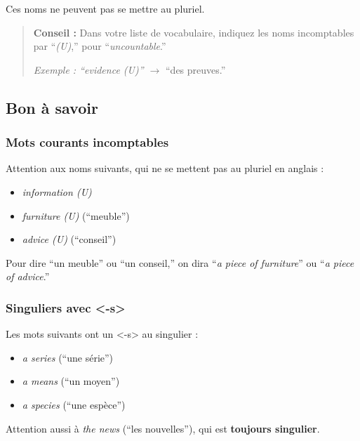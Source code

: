 \documentclass[
  10pt,
]{article}
\providecommand{\tightlist}{%
  \setlength{\itemsep}{0pt}\setlength{\parskip}{0pt}}
\begin{document}
Ces noms ne peuvent pas se mettre au pluriel.

\begin{quote}
\textbf{Conseil :} Dans votre liste de vocabulaire, indiquez les noms incomptables par ``\emph{(U)},'' pour ``\emph{uncountable}.''

\emph{Exemple : ``evidence (U)'' \(\rightarrow\)} ``des preuves.''
\end{quote}

\hypertarget{bon-uxe0-savoir}{%
\subsection{Bon à savoir}\label{bon-uxe0-savoir}}

\hypertarget{mots-courants-incomptables}{%
\subsubsection{Mots courants incomptables}\label{mots-courants-incomptables}}

Attention aux noms suivants, qui ne se mettent pas au pluriel en anglais :

\begin{itemize}
\tightlist
\item
  \emph{information (U)}
\item
  \emph{furniture (U)} (``meuble'')
\item
  \emph{advice (U)} (``conseil'')
\end{itemize}

Pour dire ``un meuble'' ou ``un conseil,'' on dira ``\emph{a piece of furniture}'' ou ``\emph{a piece of advice}.''

\hypertarget{singuliers-avec--s}{%
\subsubsection{Singuliers avec \textless-s\textgreater{}}\label{singuliers-avec--s}}

Les mots suivants ont un \textless-s\textgreater{} au singulier :

\begin{itemize}
\tightlist
\item
  \emph{a series} (``une série'')
\item
  \emph{a means} (``un moyen'')
\item
  \emph{a species} (``une espèce'')
\end{itemize}

Attention aussi à \color[HTML]{f44336}\emph{the news} \color{black} (``les nouvelles''), qui est \textbf{toujours singulier}.
\end{document}
